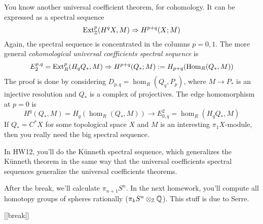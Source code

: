 You know another universal coefficient theorem, for cohomology. It can be expressed as a spectral sequence
\[
 \operatorname{Ext}^p_{\mathbb{Z}}(H^qX,M)\Rightarrow H^{p+q}(X;M)
\]
Again, the spectral sequence is concentrated in the columns $p=0,1$. The more general \emph{cohomological universal coefficients spectral sequence} is
\[
 E_2^{p,q}=\operatorname{Ext}^p_R(H_q Q_*,M)\Rightarrow H^{p+q}(Q_*;M):=H_{p+q}(\operatorname{Hom}_R(Q_*,M))
\]
The proof is done by considering $D_{p,q}=\hom_R(Q_q,P_p)$, where $M\to P_*$ is an injective resolution and $Q_*$ is a complex of projectives. The edge homomorphism at $p=0$ is
\[
 H^q(Q_*,M)=H_q(\hom_R(Q_*,M))\to E^2_{0,q}=\hom_R(H_q Q_*,M)
\]
If $Q_*=C^*X$ for some topological space $X$ and $M$ is an interesting $\pi_1X$-module, then you really need the big spectral sequence.

In HW12, you'll do the K\"unneth spectral sequence, which generalizes the K\"unneth theorem in the same way that the universal coefficients spectral sequences generalize the universal coefficients theorems.

After the break, we'll calculate $\pi_{n+1}S^n$. In the next homework, you'll compute all homotopy groups of spheres rationally ($\pi_k S^n\otimes_{\mathbb{Z}} \mathbb{Q}$). This stuff is due to Serre.

[[break]]


